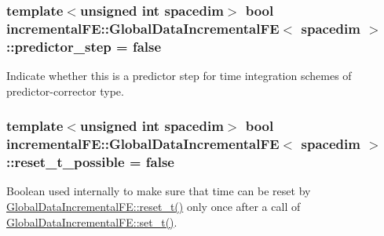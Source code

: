 \subsubsection[{\texorpdfstring{predictor\+\_\+step}{predictor_step}}]{\setlength{\rightskip}{0pt plus 5cm}template$<$unsigned int spacedim$>$ bool {\bf incremental\+F\+E\+::\+Global\+Data\+Incremental\+FE}$<$ spacedim $>$\+::predictor\+\_\+step = false\hspace{0.3cm}{\ttfamily [private]}}\hypertarget{classincremental_f_e_1_1_global_data_incremental_f_e_afe172fdb882f9dd0cd5f963386dd2ffb}{}\label{classincremental_f_e_1_1_global_data_incremental_f_e_afe172fdb882f9dd0cd5f963386dd2ffb}
Indicate whether this is a predictor step for time integration schemes of predictor-\/corrector type. 
\subsubsection[{\texorpdfstring{reset\+\_\+t\+\_\+possible}{reset_t_possible}}]{\setlength{\rightskip}{0pt plus 5cm}template$<$unsigned int spacedim$>$ bool {\bf incremental\+F\+E\+::\+Global\+Data\+Incremental\+FE}$<$ spacedim $>$\+::reset\+\_\+t\+\_\+possible = false\hspace{0.3cm}{\ttfamily [private]}}\hypertarget{classincremental_f_e_1_1_global_data_incremental_f_e_a23a3040aa83a8867ccb0a8e88bb8cb9e}{}\label{classincremental_f_e_1_1_global_data_incremental_f_e_a23a3040aa83a8867ccb0a8e88bb8cb9e}
Boolean used internally to make sure that time can be reset by \hyperlink{classincremental_f_e_1_1_global_data_incremental_f_e_ab86938372e460e4253c5cc22edffbf94}{Global\+Data\+Incremental\+F\+E\+::reset\+\_\+t()} only once after a call of \hyperlink{classincremental_f_e_1_1_global_data_incremental_f_e_a27354ebc5bf9ec655f5c7cc16ac9876d}{Global\+Data\+Incremental\+F\+E\+::set\+\_\+t()}. 
